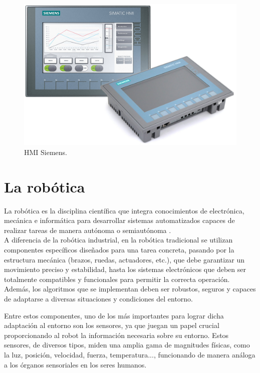 \begin{figure} [h!]
  \begin{center}
    \includegraphics[width=13cm]{figs/HMI}
  \end{center}
  \caption{\centering HMI Siemens.}
  \label{fig:ladder}
\end{figure} 

\section{La robótica}
\label{sec:segundaseccion} %

La robótica es la disciplina científica que integra conocimientos de electrónica, mecánica e informática para desarrollar sistemas automatizados capaces de realizar tareas de manera autónoma o semiautónoma \cite{definicion_robot}. \\

A diferencia de la robótica industrial, en la robótica tradicional se utilizan componentes específicos diseñados para una tarea concreta, pasando por la estructura mecánica (brazos, ruedas, actuadores, etc.), que debe garantizar un movimiento preciso y estabilidad, hasta los sistemas electrónicos que deben ser totalmente compatibles y funcionales para permitir la correcta operación. Además, los algoritmos que se implementan deben ser robustos, seguros y capaces de adaptarse a diversas situaciones y condiciones del entorno.

Entre estos componentes, uno de los más importantes para lograr dicha adaptación al entorno son los sensores, ya que juegan un papel crucial proporcionando al robot la información necesaria sobre su entorno. Estos sensores, de diversos tipos, miden una amplia gama de magnitudes físicas, como la luz, posición, velocidad, fuerza, temperatura..., funcionando de manera análoga a los órganos sensoriales en los seres humanos. 

